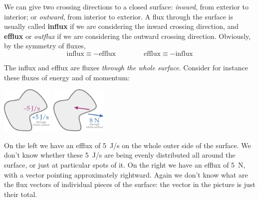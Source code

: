 \documentclass[a4paper,12pt,%
onecolumn,oneside,titlepage,%
british%
]{memoir}
\renewcommand*{\|}[1][]{\nonscript\:#1\vert\nonscript\:\mathopen{}}
\begin{document}

We can give two crossing directions to a closed surface: \emph{inward}, from exterior to interior; or \emph{outward}, from interior to exterior. A flux through the surface is usually called \textbf{influx} if we are considering the inward crossing direction, and \textbf{efflux} or \emph{outflux} if we are considering the outward crossing direction. Obviously, by the symmetry of fluxes,
\begin{equation*}
  \text{influx} \equiv -\text{efflux}
  \qquad\qquad
  \text{efflux} \equiv -\text{influx}
\end{equation*}



The influx and efflux are fluxes \emph{through the whole surface}. Consider for instance these fluxes of energy and of momentum:
\begin{center}
  \hspace*{\fill}
  \includegraphics[align=c,height=6em]{efflux_J.pdf}
  \hfill
  \includegraphics[align=c,height=6em]{efflux_N.pdf}
  \hspace*{\fill}
\end{center}
On the left we have an efflux of \qty{+5}{J/s} on the whole outer side of the surface. We don't know whether these \qty{5}{J/s} are being evenly distributed all around the surface, or just at particular spots of it. On the right we have an efflux of \qty{5}{N}, with a vector pointing approximately rightward. Again we don't know what are the flux vectors of individual pieces of the surface: the vector in the picture is just their total.
\end{document}
